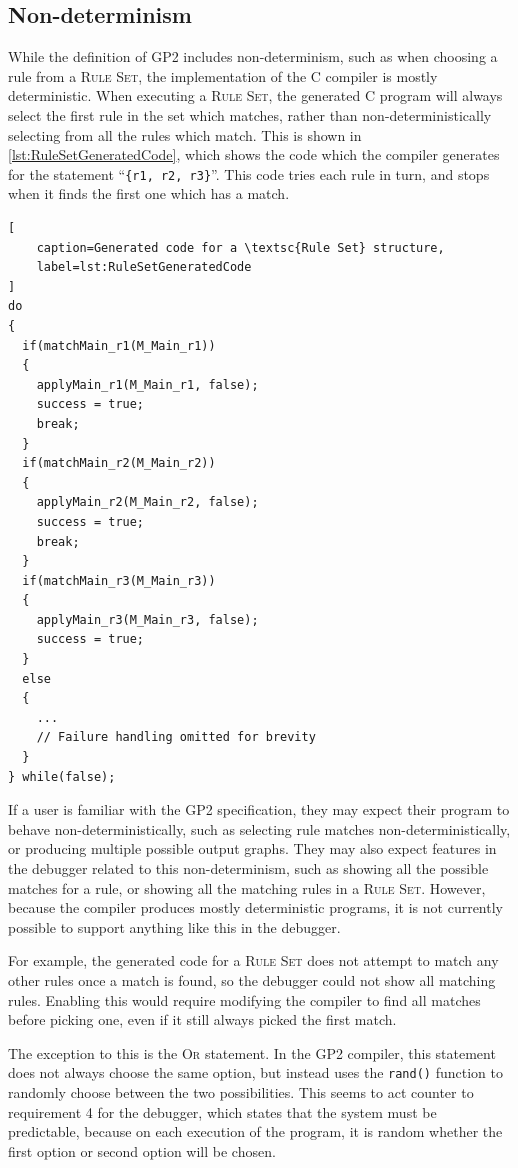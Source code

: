 \documentclass[authoryearcitations]{UoYCSproject}
\begin{document}
\subsection{Non-determinism}
\label{sec:Nondeterminism}

While the definition of GP2 includes non-determinism, such as when choosing a
rule from a \textsc{Rule Set}, the implementation of the C compiler is mostly
deterministic. When executing a \textsc{Rule Set}, the generated C program
will always select the first rule in the set which matches, rather than
non-deterministically selecting from all the rules which match. This is shown
in \autoref{lst:RuleSetGeneratedCode}, which shows the code which the compiler
generates for the statement ``\texttt{\{r1, r2, r3\}}''. This code tries each
rule in turn, and stops when it finds the first one which has a match.

\begin{lstlisting}[
    caption=Generated code for a \textsc{Rule Set} structure,
    label=lst:RuleSetGeneratedCode
]
do
{
  if(matchMain_r1(M_Main_r1))
  {
    applyMain_r1(M_Main_r1, false);
    success = true;
    break;
  }
  if(matchMain_r2(M_Main_r2))
  {
    applyMain_r2(M_Main_r2, false);
    success = true;
    break;
  }
  if(matchMain_r3(M_Main_r3))
  {
    applyMain_r3(M_Main_r3, false);
    success = true;
  }
  else
  {
    ...
    // Failure handling omitted for brevity
  }
} while(false);
\end{lstlisting}

If a user is familiar with the GP2 specification, they may expect their program
to behave non-deterministically, such as selecting rule matches
non-deterministically, or producing multiple possible output graphs. They may
also expect features in the debugger related to this non-determinism, such as
showing all the possible matches for a rule, or showing all the matching rules
in a \textsc{Rule Set}. However, because the compiler produces mostly 
deterministic programs, it is not currently possible to support anything like
this in the debugger.

For example, the generated code for a \textsc{Rule Set} does not attempt to
match any other rules once a match is found, so the debugger could not show all
matching rules. Enabling this would require modifying the compiler to find all
matches before picking one, even if it still always picked the first match.

The exception to this is the \textsc{Or} statement. In the GP2 compiler, this
statement does not always choose the same option, but instead uses the
\texttt{rand()} function to randomly choose between the two possibilities.
This seems to act counter to requirement 4 for the debugger, which states
that the system must be predictable, because on each execution of the program,
it is random whether the first option or second option will be chosen.
\end{document}
